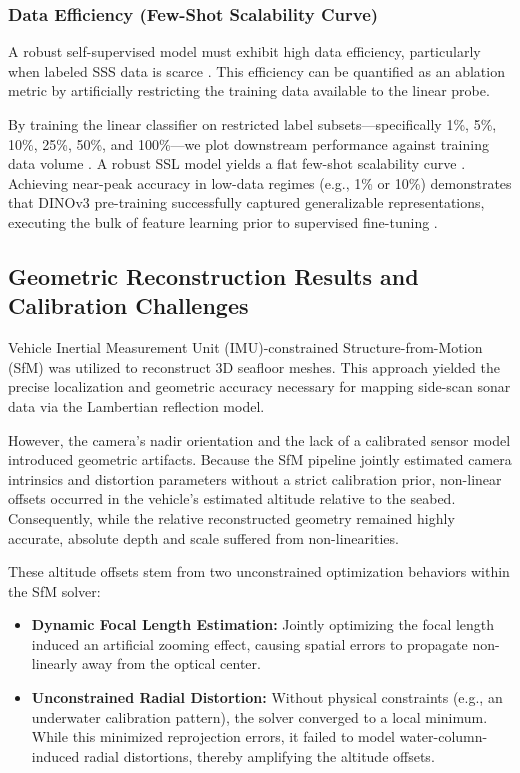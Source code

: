 \documentclass[12pt]{article}
\begin{document}
\subsubsection{Data Efficiency (Few-Shot Scalability Curve)}
A robust self-supervised model must exhibit high data efficiency, particularly when labeled SSS data is scarce \cite{oriane2025, alan2022}. This efficiency can be quantified as an ablation metric by artificially restricting the training data available to the linear probe.

By training the linear classifier on restricted label subsets—specifically 1\%, 5\%, 10\%, 25\%, 50\%, and 100\%—we plot downstream performance against training data volume \cite{marks2024closer, caron2021}. A robust SSL model yields a flat few-shot scalability curve \cite{marks2024closer}. Achieving near-peak accuracy in low-data regimes (e.g., 1\% or 10\%) demonstrates that DINOv3 pre-training successfully captured generalizable representations, executing the bulk of feature learning prior to supervised fine-tuning \cite{marks2024closer}.

\subsection{Geometric Reconstruction Results and Calibration Challenges}

Vehicle Inertial Measurement Unit (IMU)-constrained Structure-from-Motion (SfM) was utilized to reconstruct 3D seafloor meshes. This approach yielded the precise localization and geometric accuracy necessary for mapping side-scan sonar data via the Lambertian reflection model.

However, the camera's nadir orientation and the lack of a calibrated sensor model introduced geometric artifacts. Because the SfM pipeline jointly estimated camera intrinsics and distortion parameters without a strict calibration prior, non-linear offsets occurred in the vehicle's estimated altitude relative to the seabed. Consequently, while the relative reconstructed geometry remained highly accurate, absolute depth and scale suffered from non-linearities.

These altitude offsets stem from two unconstrained optimization behaviors within the SfM solver:
\begin{itemize}
    \item \textbf{Dynamic Focal Length Estimation:} Jointly optimizing the focal length induced an artificial zooming effect, causing spatial errors to propagate non-linearly away from the optical center.
    \item \textbf{Unconstrained Radial Distortion:} Without physical constraints (e.g., an underwater calibration pattern), the solver converged to a local minimum. While this minimized reprojection errors, it failed to model water-column-induced radial distortions, thereby amplifying the altitude offsets.
\end{itemize}
\end{document}

